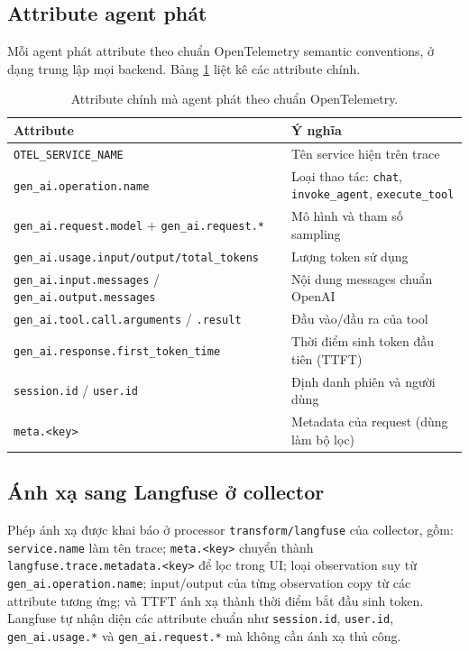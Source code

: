 \subsection{Attribute agent phát}

Mỗi agent phát attribute theo chuẩn OpenTelemetry semantic conventions, ở dạng trung lập
mọi backend. Bảng \ref{tab:otel-attr} liệt kê các attribute chính.

\begin{table}[htbp]
\centering
\caption{Attribute chính mà agent phát theo chuẩn OpenTelemetry.}
\label{tab:otel-attr}
\small
\begin{tabular}{@{}p{6.2cm}p{8.2cm}@{}}
\toprule
\textbf{Attribute} & \textbf{Ý nghĩa} \\
\midrule
\texttt{OTEL\_SERVICE\_NAME} & Tên service hiện trên trace \\
\texttt{gen\_ai.operation.name} & Loại thao tác: \texttt{chat}, \texttt{invoke\_agent}, \texttt{execute\_tool} \\
\texttt{gen\_ai.request.model} + \texttt{gen\_ai.request.*} & Mô hình và tham số sampling \\
\texttt{gen\_ai.usage.input/output/total\_tokens} & Lượng token sử dụng \\
\texttt{gen\_ai.input.messages} / \texttt{gen\_ai.output.messages} & Nội dung messages chuẩn OpenAI \\
\texttt{gen\_ai.tool.call.arguments} / \texttt{.result} & Đầu vào/đầu ra của tool \\
\texttt{gen\_ai.response.first\_token\_time} & Thời điểm sinh token đầu tiên (TTFT) \\
\texttt{session.id} / \texttt{user.id} & Định danh phiên và người dùng \\
\texttt{meta.<key>} & Metadata của request (dùng làm bộ lọc) \\
\bottomrule
\end{tabular}
\end{table}

\subsection{Ánh xạ sang Langfuse ở collector}

Phép ánh xạ được khai báo ở processor \texttt{transform/langfuse} của collector, gồm:
\texttt{service.name} làm tên trace; \texttt{meta.<key>} chuyển thành
\texttt{langfuse.trace.metadata.<key>} để lọc trong UI; loại observation suy từ
\texttt{gen\_ai.operation.name}; input/output của từng observation copy từ các attribute
tương ứng; và TTFT ánh xạ thành thời điểm bắt đầu sinh token. Langfuse tự nhận diện các
attribute chuẩn như \texttt{session.id}, \texttt{user.id}, \texttt{gen\_ai.usage.*} và
\texttt{gen\_ai.request.*} mà không cần ánh xạ thủ công.

